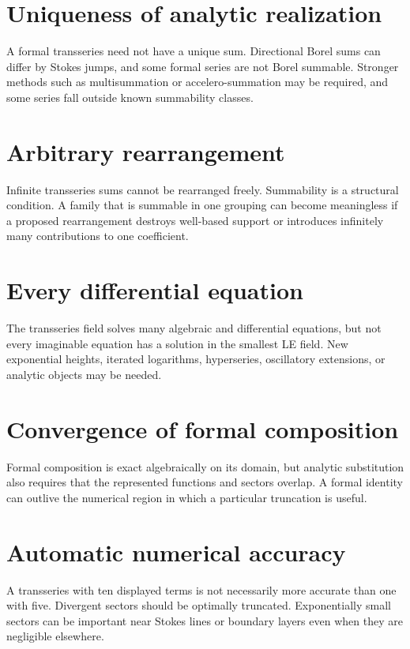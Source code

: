 \documentclass[11pt,openany]{book}
\theoremstyle{plain}
\theoremstyle{definition}
\theoremstyle{remark}
\begin{document}
\section{Uniqueness of analytic realization}
A formal transseries need not have a unique sum. Directional Borel sums can differ by Stokes jumps, and some formal series are not Borel summable. Stronger methods such as multisummation or accelero-summation may be required, and some series fall outside known summability classes.

\section{Arbitrary rearrangement}
Infinite transseries sums cannot be rearranged freely. Summability is a structural condition. A family that is summable in one grouping can become meaningless if a proposed rearrangement destroys well-based support or introduces infinitely many contributions to one coefficient.

\section{Every differential equation}
The transseries field solves many algebraic and differential equations, but not every imaginable equation has a solution in the smallest LE field. New exponential heights, iterated logarithms, hyperseries, oscillatory extensions, or analytic objects may be needed.

\section{Convergence of formal composition}
Formal composition is exact algebraically on its domain, but analytic substitution also requires that the represented functions and sectors overlap. A formal identity can outlive the numerical region in which a particular truncation is useful.

\section{Automatic numerical accuracy}
A transseries with ten displayed terms is not necessarily more accurate than one with five. Divergent sectors should be optimally truncated. Exponentially small sectors can be important near Stokes lines or boundary layers even when they are negligible elsewhere.
\end{document}
